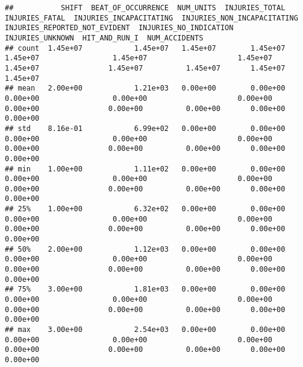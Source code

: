 \documentclass[american,]{article}
\begin{document}
\begin{verbatim}
##           SHIFT  BEAT_OF_OCCURRENCE  NUM_UNITS  INJURIES_TOTAL  INJURIES_FATAL  INJURIES_INCAPACITATING  INJURIES_NON_INCAPACITATING  INJURIES_REPORTED_NOT_EVIDENT  INJURIES_NO_INDICATION  INJURIES_UNKNOWN  HIT_AND_RUN_I  NUM_ACCIDENTS
## count  1.45e+07            1.45e+07   1.45e+07        1.45e+07        1.45e+07                 1.45e+07                     1.45e+07                       1.45e+07                1.45e+07          1.45e+07       1.45e+07       1.45e+07
## mean   2.00e+00            1.21e+03   0.00e+00        0.00e+00        0.00e+00                 0.00e+00                     0.00e+00                       0.00e+00                0.00e+00          0.00e+00       0.00e+00       0.00e+00
## std    8.16e-01            6.99e+02   0.00e+00        0.00e+00        0.00e+00                 0.00e+00                     0.00e+00                       0.00e+00                0.00e+00          0.00e+00       0.00e+00       0.00e+00
## min    1.00e+00            1.11e+02   0.00e+00        0.00e+00        0.00e+00                 0.00e+00                     0.00e+00                       0.00e+00                0.00e+00          0.00e+00       0.00e+00       0.00e+00
## 25%    1.00e+00            6.32e+02   0.00e+00        0.00e+00        0.00e+00                 0.00e+00                     0.00e+00                       0.00e+00                0.00e+00          0.00e+00       0.00e+00       0.00e+00
## 50%    2.00e+00            1.12e+03   0.00e+00        0.00e+00        0.00e+00                 0.00e+00                     0.00e+00                       0.00e+00                0.00e+00          0.00e+00       0.00e+00       0.00e+00
## 75%    3.00e+00            1.81e+03   0.00e+00        0.00e+00        0.00e+00                 0.00e+00                     0.00e+00                       0.00e+00                0.00e+00          0.00e+00       0.00e+00       0.00e+00
## max    3.00e+00            2.54e+03   0.00e+00        0.00e+00        0.00e+00                 0.00e+00                     0.00e+00                       0.00e+00                0.00e+00          0.00e+00       0.00e+00       0.00e+00
\end{verbatim}


\end{document}

